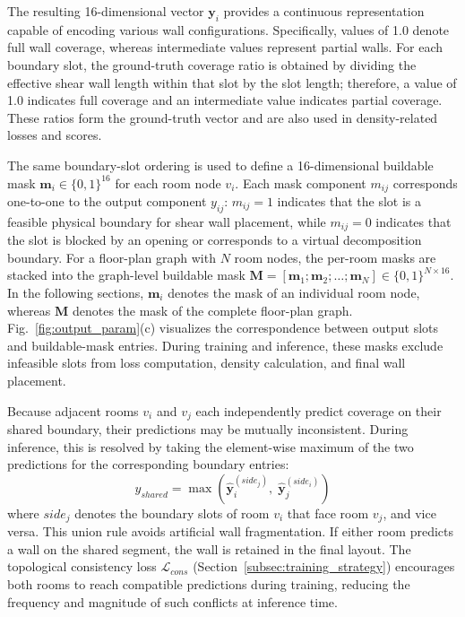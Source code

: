 The resulting 16-dimensional vector $\mathbf{y}_i$ provides a continuous representation capable of encoding various wall configurations. Specifically, values of 1.0 denote full wall coverage, whereas intermediate values represent partial walls. For each boundary slot, the ground-truth coverage ratio is obtained by dividing the effective shear wall length within that slot by the slot length; therefore, a value of 1.0 indicates full coverage and an intermediate value indicates partial coverage. These ratios form the ground-truth vector and are also used in density-related losses and scores.

The same boundary-slot ordering is used to define a 16-dimensional buildable mask $\mathbf{m}_i \in \{0,1\}^{16}$ for each room node $v_i$. Each mask component $m_{ij}$ corresponds one-to-one to the output component $y_{ij}$: $m_{ij}=1$ indicates that the slot is a feasible physical boundary for shear wall placement, while $m_{ij}=0$ indicates that the slot is blocked by an opening or corresponds to a virtual decomposition boundary. For a floor-plan graph with $N$ room nodes, the per-room masks are stacked into the graph-level buildable mask $\mathbf{M}=[\mathbf{m}_1;\mathbf{m}_2;\ldots;\mathbf{m}_N]\in\{0,1\}^{N\times16}$. In the following sections, $\mathbf{m}_i$ denotes the mask of an individual room node, whereas $\mathbf{M}$ denotes the mask of the complete floor-plan graph. Fig.~\ref{fig:output_param}(c) visualizes the correspondence between output slots and buildable-mask entries. During training and inference, these masks exclude infeasible slots from loss computation, density calculation, and final wall placement.

Because adjacent rooms $v_i$ and $v_j$ each independently predict coverage on their shared boundary, their predictions may be mutually inconsistent.
During inference, this is resolved by taking the element-wise maximum of the two predictions for the corresponding boundary entries:
\begin{equation}
\hat{y}_{shared} = \max\!\left(\hat{\mathbf{y}}_i^{(side_j)},\; \hat{\mathbf{y}}_j^{(side_i)}\right)
\label{eq:boundary_union}
\end{equation}
where $side_j$ denotes the boundary slots of room $v_i$ that face room $v_j$, and vice versa.
This union rule avoids artificial wall fragmentation. If either room predicts a wall on the shared segment, the wall is retained in the final layout.
The topological consistency loss $\mathcal{L}_{cons}$ (Section~\ref{subsec:training_strategy}) encourages both rooms to reach compatible predictions during training, reducing the frequency and magnitude of such conflicts at inference time.

